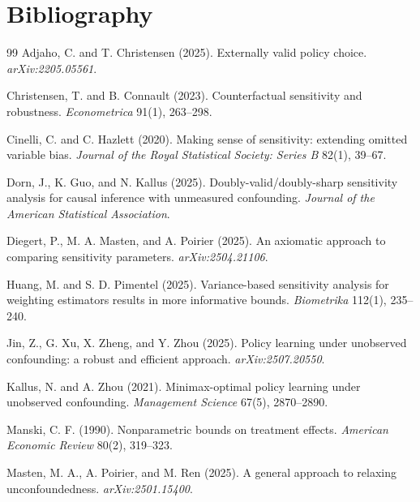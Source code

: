 \documentclass[11pt]{article}
\theoremstyle{definition}
\theoremstyle{plain}
\theoremstyle{remark}
\begin{document}
\section*{Bibliography}
\begin{thebibliography}{99}
Adjaho, C. and T. Christensen (2025).
Externally valid policy choice.
\emph{arXiv:2205.05561}.

Christensen, T. and B. Connault (2023).
Counterfactual sensitivity and robustness.
\emph{Econometrica} 91(1), 263--298.

Cinelli, C. and C. Hazlett (2020).
Making sense of sensitivity: extending omitted variable bias.
\emph{Journal of the Royal Statistical Society: Series B} 82(1), 39--67.

Dorn, J., K. Guo, and N. Kallus (2025).
Doubly-valid/doubly-sharp sensitivity analysis for causal inference with unmeasured confounding.
\emph{Journal of the American Statistical Association}.

Diegert, P., M. A. Masten, and A. Poirier (2025).
An axiomatic approach to comparing sensitivity parameters.
\emph{arXiv:2504.21106}.

Huang, M. and S. D. Pimentel (2025).
Variance-based sensitivity analysis for weighting estimators results in more informative bounds.
\emph{Biometrika} 112(1), 235--240.

Jin, Z., G. Xu, X. Zheng, and Y. Zhou (2025).
Policy learning under unobserved confounding: a robust and efficient approach.
\emph{arXiv:2507.20550}.

Kallus, N. and A. Zhou (2021).
Minimax-optimal policy learning under unobserved confounding.
\emph{Management Science} 67(5), 2870--2890.

Manski, C. F. (1990).
Nonparametric bounds on treatment effects.
\emph{American Economic Review} 80(2), 319--323.

Masten, M. A., A. Poirier, and M. Ren (2025).
A general approach to relaxing unconfoundedness.
\emph{arXiv:2501.15400}.


\end{thebibliography}
\end{document}

